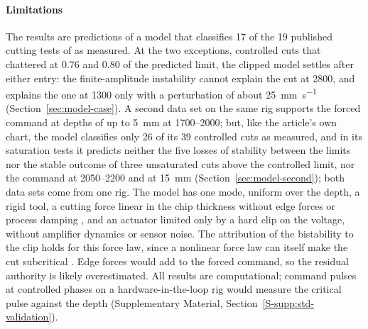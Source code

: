 \paragraph{Limitations}
The results are predictions of a model that classifies 17 of the 19 published cutting tests of \citet{ozsoy2026robust} as measured. At the two exceptions, controlled cuts that chattered at 0.76 and 0.80 of the predicted limit, the clipped model settles after either entry: the finite-amplitude instability cannot explain the cut at \SI{2800}{\rpm}, and explains the one at \SI{1300}{\rpm} only with a perturbation of about \SI{25}{\milli\metre\per\second} (Section~\ref{sec:model-case}). A second data set on the same rig \citep{ozsoy2025frequency} supports the forced command at depths of up to \SI{5}{\milli\metre} at 1700--\SI{2000}{\rpm}; but, like the article's own chart, the model classifies only 26 of its 39 controlled cuts as measured, and in its saturation tests it predicts neither the five losses of stability between the limits nor the stable outcome of three unsaturated cuts above the controlled limit, nor the command at 2050--\SI{2200}{\rpm} and at \SI{15}{\milli\metre} (Section~\ref{sec:model-second}); both data sets come from one rig. The model has one mode, uniform over the depth, a rigid tool, a cutting force linear in the chip thickness without edge forces or process damping \citep{altintas2012book,budak2010process}, and an actuator limited only by a hard clip on the voltage, without amplifier dynamics or sensor noise. The attribution of the bistability to the clip holds for this force law, since a nonlinear force law can itself make the cut subcritical \citep{kalmarnagy2001subcritical,dombovari2008estimates}. Edge forces would add to the forced command, so the residual authority is likely overestimated. All results are computational; command pulses at controlled phases on a hardware-in-the-loop rig \citep{sahu2021bistability} would measure the critical pulse against the depth (Supplementary Material, Section~\ref{S-supp:std-validation}).

